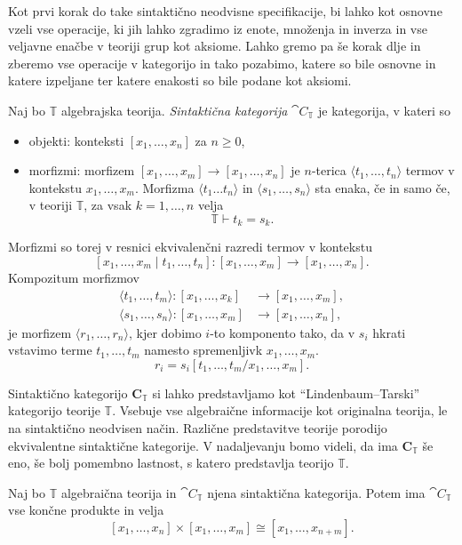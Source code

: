 \documentclass[../kategoricna_logika.tex]{subfiles}
\begin{document}
Kot prvi korak do take sintaktično neodvisne specifikacije,
bi lahko kot osnovne vzeli vse operacije, ki jih lahko zgradimo iz
enote, množenja in inverza in vse
veljavne enačbe v teoriji grup kot aksiome. Lahko gremo pa še korak dlje
in zberemo vse operacije v kategorijo in tako pozabimo, katere so bile
osnovne in katere izpeljane ter katere enakosti so bile podane kot aksiomi.
%
\begin{definicija}
  Naj bo $\mathbb{T}$ algebrajska teorija.
  \emph{Sintaktična kategorija} $\cat{C}_\mathbb{T}$ je kategorija,
  v kateri so
  \begin{itemize}
  \item objekti: konteksti $[x_1, \ldots, x_n]$ za $n \geq 0$,
%
  \item morfizmi: morfizem $[x_1, \ldots, x_m] \to [x_1, \ldots, x_n]$
    je $n$-terica $\langle t_1, \ldots, t_n \rangle$ termov v kontekstu
    $x_1, \ldots, x_m$. Morfizma $\langle t_1 \ldots t_n \rangle$ in
    $\langle s_1, \ldots, s_n \rangle$ sta enaka, če in samo če,
    v teoriji $\mathbb{T}$, za vsak $k = 1, \ldots, n$ velja
    $$\mathbb{T} \vdash t_k = s_k.$$
\end{itemize}
%
Morfizmi so torej v resnici ekvivalenčni razredi termov v kontekstu
$$[x_1, \ldots, x_m \mid t_1, \ldots, t_n] : [x_1, \ldots, x_m] \to [x_1, \ldots, x_n].$$
%
Kompozitum morfizmov
  \begin{align*}
    \langle t_1, \ldots, t_m \rangle : [x_1, \ldots, x_k] &\to [x_1, \ldots, x_m], \\
    \langle s_1, \ldots, s_n \rangle : [x_1, \ldots, x_m] &\to [x_1, \ldots, x_n],
  \end{align*}
je morfizem $\langle r_1, \ldots, r_n \rangle$, kjer dobimo $i$-to komponento tako,
da v $s_i$ hkrati vstavimo terme $t_1, \ldots, t_m$ namesto
spremenljivk $x_1, \ldots, x_m$.
$$r_i = s_i[t_1, \ldots, t_m / x_1, \ldots, x_m].$$
%
\end{definicija}
Sintaktično kategorijo $\mathbf{C}_{\mathbb{T}}$ si lahko predstavljamo kot
"`Lindenbaum--Tarski"' kategorijo teorije $\mathbb{T}$. Vsebuje vse algebraične
informacije kot originalna teorija, le na sintaktično neodvisen način.
Različne predstavitve teorije porodijo ekvivalentne sintaktične
kategorije. V nadaljevanju bomo videli, da ima $\mathbf{C}_{\mathbb{T}}$ še eno,
še bolj pomembno lastnost, s katero predstavlja teorijo $\mathbb{T}$.
%
\begin{lema}
  Naj bo $\mathbb{T}$ algebraična teorija in $\cat{C}_\mathbb{T}$
  njena sintaktična kategorija. Potem ima $\cat{C}_\mathbb{T}$ vse
  končne produkte in velja
$$[x_1, \ldots, x_n] \times [x_1, \ldots, x_m] \cong [x_1, \ldots, x_{n+m}].$$
\end{lema}
\end{document}
